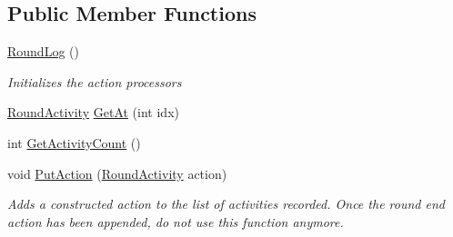 \subsection*{Public Member Functions}
\begin{DoxyCompactItemize}
\item 
\hypertarget{class_m_b_c_1_1_core_1_1_round_log_a50d3d5c41078aa520500ca86dd5694ab}{\hyperlink{class_m_b_c_1_1_core_1_1_round_log_a50d3d5c41078aa520500ca86dd5694ab}{Round\-Log} ()}\label{class_m_b_c_1_1_core_1_1_round_log_a50d3d5c41078aa520500ca86dd5694ab}

\begin{DoxyCompactList}\small\item\em Initializes the action processors\end{DoxyCompactList}\item 
\hyperlink{class_m_b_c_1_1_core_1_1_round_log_1_1_round_activity}{Round\-Activity} \hyperlink{class_m_b_c_1_1_core_1_1_round_log_a14deb5b327e8c77d3535e342701711d9}{Get\-At} (int idx)
\item 
int \hyperlink{class_m_b_c_1_1_core_1_1_round_log_a389bd537cf73c73998e0a789961d7536}{Get\-Activity\-Count} ()
\item 
\hypertarget{class_m_b_c_1_1_core_1_1_round_log_a0bb405409acf2b889d714bbff68abc94}{void \hyperlink{class_m_b_c_1_1_core_1_1_round_log_a0bb405409acf2b889d714bbff68abc94}{Put\-Action} (\hyperlink{class_m_b_c_1_1_core_1_1_round_log_1_1_round_activity}{Round\-Activity} action)}\label{class_m_b_c_1_1_core_1_1_round_log_a0bb405409acf2b889d714bbff68abc94}

\begin{DoxyCompactList}\small\item\em Adds a constructed action to the list of activities recorded. Once the round end action has been appended, do not use this function anymore.\end{DoxyCompactList}\end{DoxyCompactItemize}
